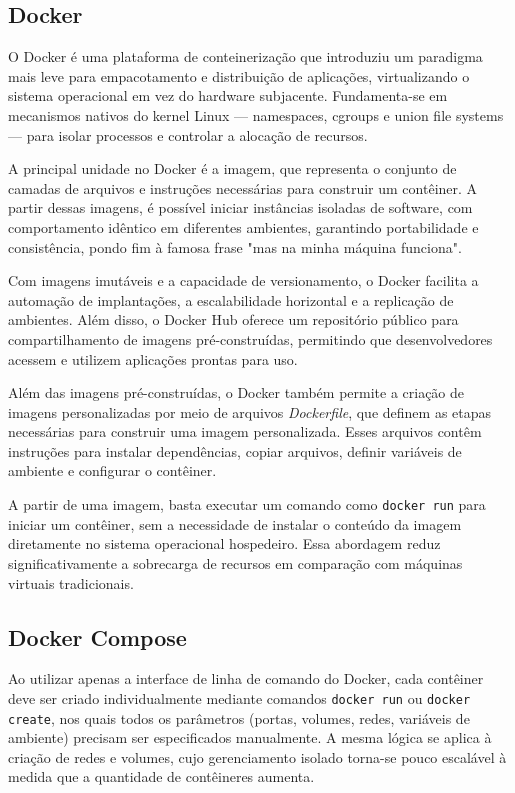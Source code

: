 \subsection{Docker}
\label{subsection:Docker}

O Docker é uma plataforma de conteinerização que introduziu um paradigma mais leve para empacotamento e distribuição de aplicações, virtualizando o sistema operacional em vez do hardware subjacente. Fundamenta-se em mecanismos nativos do kernel Linux — namespaces, cgroups e union file systems — para isolar processos e controlar a alocação de recursos.

A principal unidade no Docker é a imagem, que representa o conjunto de camadas de arquivos e instruções necessárias para construir um contêiner. A partir dessas imagens, é possível iniciar instâncias isoladas de software, com comportamento idêntico em diferentes ambientes, garantindo portabilidade e consistência, pondo fim à famosa frase "mas na minha máquina funciona".

Com imagens imutáveis e a capacidade de versionamento, o Docker facilita a automação de implantações, a escalabilidade horizontal e a replicação de ambientes. Além disso, o Docker Hub oferece um repositório público para compartilhamento de imagens pré-construídas, permitindo que desenvolvedores acessem e utilizem aplicações prontas para uso.

Além das imagens pré-construídas, o Docker também permite a criação de imagens personalizadas por meio de arquivos \textit{Dockerfile}, que definem as etapas necessárias para construir uma imagem personalizada. Esses arquivos contêm instruções para instalar dependências, copiar arquivos, definir variáveis de ambiente e configurar o contêiner.

A partir de uma imagem, basta executar um comando como \verb|docker run| para iniciar um contêiner, sem a necessidade de instalar o conteúdo da imagem diretamente no sistema operacional hospedeiro. Essa abordagem reduz significativamente a sobrecarga de recursos em comparação com máquinas virtuais tradicionais.

\subsection{Docker Compose}
\label{subsection:DockerCompose}

Ao utilizar apenas a interface de linha de comando do Docker, cada contêiner deve ser criado individualmente mediante comandos \verb|docker run| ou \verb|docker create|, nos quais todos os parâmetros (portas, volumes, redes, variáveis de ambiente) precisam ser especificados manualmente. A mesma lógica se aplica à criação de redes e volumes, cujo gerenciamento isolado torna-se pouco escalável à medida que a quantidade de contêineres aumenta.


